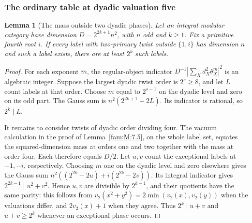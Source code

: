 \documentclass[11pt,a4paper]{article}
\numberwithin{equation}{section}
\newtheorem{lemma}[theorem]{Lemma}
\theoremstyle{remark}
\begin{document}
\subsubsection{The ordinary table at dyadic valuation five}\label{fam:Q:sec:5.2}
\begin{lemma}[The mass outside two dyadic phases]\label{fam:Q:5.7}\label{fam:Q:n:q12:dyadic-mass}
Let an integral modular category have dimension $D=2^{2k+1}n^2$,
with $n$ odd and $k\ge1$. Fix a primitive fourth root $i$.
If every label with two-primary twist outside $\{1,i\}$ has
dimension $n$ and such a label exists, there are at least $2^k$
such labels.
\end{lemma}
\begin{proof}
For each exponent $m$, the regular-object indicator
$D^{-1}|\sum_X d_X^2\theta_X^m|^2$ is an algebraic integer.
Suppose the largest dyadic twist order is $2^s\ge8$, and let $L$
count labels at that order. Choose $m$ equal to $2^{s-1}$ on the
dyadic level and zero on its odd part. The Gauss sum is
$n^2(2^{2k+1}-2L)$. Its indicator is rational, so $2^k\mid L$.

It remains to consider twists of dyadic order dividing four.
The vacuum calculation in the proof of Lemma~\ref{fam:M:7.5},
on the whole label set, equates the squared-dimension mass at
orders one and two together with the mass at order four. Each
therefore equals $D/2$. Let $u,v$ count the exceptional labels
at $-1,-i$, respectively. Choosing $m$ one on the dyadic level
and zero elsewhere gives the Gauss sum
$n^2((2^{2k}-2u)+i(2^{2k}-2v))$. Its integral indicator gives
$2^{2k-1}\mid u^2+v^2$. Hence $u,v$ are divisible by $2^{k-1}$,
and their quotients have the same parity: this follows from
$v_2(x^2+y^2)=2\min(v_2(x),v_2(y))$ when the valuations differ,
and $2v_2(x)+1$ when they agree. Thus $2^k\mid u+v$ and $u+v\ge2^k$ whenever an exceptional phase occurs.
\end{proof}
\end{document}
